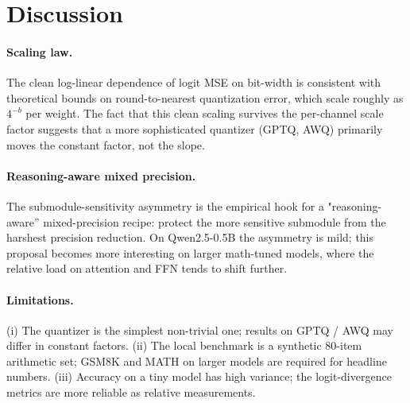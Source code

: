 \section{Discussion}

\paragraph{Scaling law.} The clean log-linear dependence of logit MSE on
bit-width is consistent with theoretical bounds on round-to-nearest
quantization error, which scale roughly as $4^{-b}$ per weight. The
fact that this clean scaling survives the per-channel scale factor
suggests that a more sophisticated quantizer (GPTQ, AWQ) primarily
moves the constant factor, not the slope.

\paragraph{Reasoning-aware mixed precision.} The submodule-sensitivity
asymmetry is the empirical hook for a "reasoning-aware'' mixed-precision
recipe: protect the more sensitive submodule from the harshest precision
reduction. On Qwen2.5-0.5B the asymmetry is mild; this proposal becomes
more interesting on larger math-tuned models, where the relative load on
attention and FFN tends to shift further.

\paragraph{Limitations.} (i) The quantizer is the simplest non-trivial
one; results on GPTQ / AWQ may differ in constant factors. (ii) The local
benchmark is a synthetic 80-item arithmetic set; GSM8K and MATH on
larger models are required for headline numbers. (iii) Accuracy on a tiny
model has high variance; the logit-divergence metrics are more reliable as
relative measurements.
